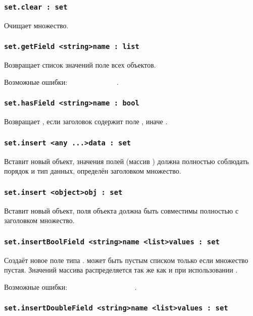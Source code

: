 \documentclass[a4paper, 14pt]{extarticle}
\newcommand{\ferror}[1]{{\fontsize{11pt}{12pt} \tt \colorbox{function}{\textcolor{white}{#1}}}}
\begin{document}
\subsubsection{\lstinline|set.clear : set|}

Очищает множество.

\subsubsection{\lstinline|set.getField <string>name : list|}

Возвращает список значений поле  всех объектов.

Возможные ошибки: \ferror{FieldNotFound}.

\subsubsection{\lstinline|set.hasField <string>name : bool|}

Возвращает \true, если заголовок содержит поле , иначе \false.

\subsubsection{\lstinline|set.insert <any ...>data : set|}

Вставит новый объект, значения полей (массив ) должна полностью соблюдать порядок и тип данных, определён заголовком множество.

\subsubsection{\lstinline|set.insert <object>obj : set|}

Вставит новый объект, поля объекта  должна быть совместимы полностью с заголовком множество.

\subsubsection{\lstinline|set.insertBoolField <string>name <list>values : set|}

Создаёт новое поле типа \bool.  может быть пустым списком только если множество пустая. Значений массива распределяется так же как и при использовании .

Возможные ошибки: \ferror{FieldAlreadyExists}.

\subsubsection{\lstinline|set.insertDoubleField <string>name <list>values : set|}
\end{document}
